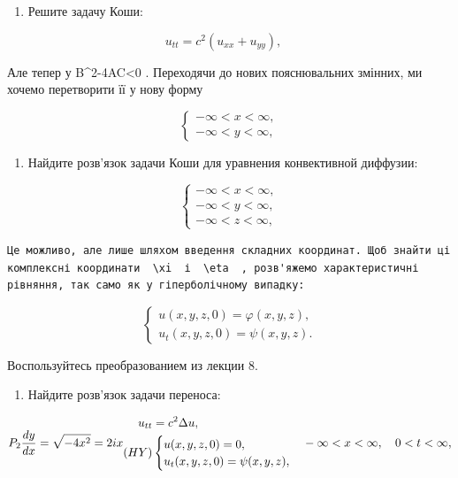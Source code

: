 \documentclass[
  ukrainian,
]{article}
\providecommand{\tightlist}{%
  \setlength{\itemsep}{0pt}\setlength{\parskip}{0pt}}
\begin{document}
\begin{enumerate}
\def\labelenumi{\arabic{enumi}.}
\tightlist
\item
  Решите задачу Коши:
\end{enumerate}

\[
u_{tt} = c^2 (u_{xx} + u_{yy}), \quad
\]

Але тепер у B\^{}2-4AC\textless0 . Переходячи до нових пояснювальних
змінних, ми хочемо перетворити її у нову форму

\[
\begin{cases} -\infty < x < \infty, \\ -\infty < y < \infty, \end{cases}
\]

\begin{enumerate}
\def\labelenumi{\arabic{enumi}.}
\setcounter{enumi}{1}
\tightlist
\item
  Найдите розв'язок задачи Коши для уравнения конвективной диффузии:
\end{enumerate}

\[
\begin{cases} -\infty < x < \infty, \\ -\infty < y < \infty, \\ -\infty < z < \infty, \end{cases}
\]

\begin{verbatim}
Це можливо, але лише шляхом введення складних координат. Щоб знайти ці комплексні координати  \xi  і  \eta  , розв'яжемо характеристичні рівняння, так само як у гіперболічному випадку:
\end{verbatim}

\[
\begin{cases} u(x, y, z, 0) = \varphi(x, y, z), \\ u_{t}(x, y, z, 0) = \psi(x, y, z). \end{cases}
\]

Воспользуйтесь преобразованием из лекции 8.

\begin{enumerate}
\def\labelenumi{\arabic{enumi}.}
\setcounter{enumi}{2}
\tightlist
\item
  Найдите розв'язок задачи переноса:
\end{enumerate}

\[
P_{2}
\frac{dy}{dx} = \sqrt{-4x^2} = 2ix
\begin{aligned} u_{tt} &= c^2 \Delta u, \\ (HY) & \begin{cases} u(x, y, z, 0) = 0, \\ u_t(x, y, z, 0) = \psi(x, y, z), \end{cases} \end{aligned}
\\ -\infty < x < \infty, \quad 0 < t < \infty,
\]
\end{document}
